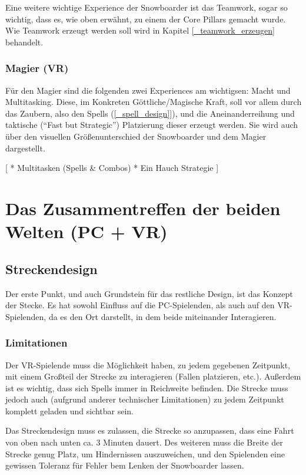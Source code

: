 Eine weitere wichtige Experience der Snowboarder ist das Teamwork, sogar so wichtig, dass es, wie oben erwähnt, zu einem der Core Pillars gemacht wurde. Wie Teamwork erzeugt werden soll wird in Kapitel \ref{_teamwork_erzeugen} behandelt.

\subsubsection{Magier (VR)}

Für den Magier sind die folgenden zwei Experiences am wichtigsen: Macht und Multitasking. Diese, im Konkreten Göttliche/Magische Kraft, soll vor allem durch das Zaubern, also den Spells (\ref{_spell_design}]), und die Aneinanderreihung und taktische ("`Fast but Strategic"') Platzierung dieser erzeugt werden. Sie wird auch über den visuellen Größenunterschied der Snowboarder und dem Magier dargestellt.

[
* Multitasken (Spells \& Combos)
* Ein Hauch Strategie
]

\section{Das Zusammentreffen der beiden Welten (PC + VR)}

\subsection{Streckendesign}

Der erste Punkt, und auch Grundstein für das restliche Design, ist das Konzept der Stecke. Es hat sowohl Einfluss auf die PC-Spielenden, als auch auf den VR-Spielenden, da es den Ort darstellt, in dem beide miteinander Interagieren.

\subsubsection{Limitationen}

Der VR-Spielende muss die Möglichkeit haben, zu jedem gegebenen Zeitpunkt, mit einem Großteil der Strecke zu interagieren (Fallen platzieren, etc.). Außerdem ist es wichtig, dass sich Spells immer in Reichweite befinden. Die Strecke muss jedoch auch (aufgrund anderer technischer Limitationen) zu jedem Zeitpunkt komplett geladen und sichtbar sein.

Das Streckendesign muss es zulassen, die Strecke so anzupassen, dass eine Fahrt von oben nach unten ca. 3 Minuten dauert. Des weiteren muss die Breite der Strecke genug Platz, um Hindernissen auszuweichen, und den Spielenden eine gewissen Toleranz für Fehler bem Lenken der Snowboarder lassen.

